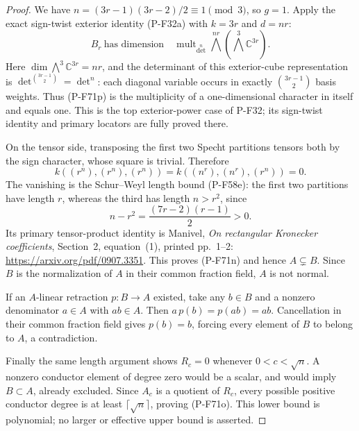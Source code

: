 \begin{proof}
We have $n=(3r-1)(3r-2)/2\equiv1\pmod3$, so $g=1$.
Apply the exact sign-twist exterior identity (P-F32a)
with $k=3r$ and $d=nr$:
\[
 B_r\ \text{has dimension}\quad
 \operatorname{mult}_{\det^n}
       \bigwedge^{nr}\!\left(\bigwedge^3\mathbb C^{3r}\right).
                                                               \tag{P-F71p}
\]
Here $\dim\bigwedge^3\mathbb C^{3r}=nr$, and the determinant
of this exterior-cube representation is
$\det^{\binom{3r-1}{2}}=\det^n$: each diagonal variable
occurs in exactly $\binom{3r-1}{2}$ basis weights.
Thus (P-F71p) is the multiplicity of a one-dimensional
character in itself and equals one.  This is the top
exterior-power case of P-F32; its sign-twist identity
and primary locators are fully proved there.

On the tensor side, transposing the first two Specht
partitions tensors both by the sign character, whose
square is trivial.  Therefore
\[
 k((r^n),(r^n),(r^n))
          =k((n^r),(n^r),(r^n))=0.
                                                               \tag{P-F71q}
\]
The vanishing is the Schur--Weyl length bound (P-F58e):
the first two partitions have length $r$, whereas the
third has length $n>r^2$, since
\[
                  n-r^2=\frac{(7r-2)(r-1)}2>0.
\]
Its primary tensor-product identity is Manivel,
\emph{On rectangular Kronecker coefficients}, Section~2,
equation~(1), printed pp.~1--2:
\url{https://arxiv.org/pdf/0907.3351}.
This proves (P-F71n) and hence $A\subsetneq B$.
Since $B$ is the normalization of $A$ in their common
fraction field, $A$ is not normal.

If an $A$-linear retraction $p:B\to A$ existed,
take any $b\in B$ and a nonzero denominator $a\in A$
with $ab\in A$.  Then
$a\,p(b)=p(ab)=ab$.  Cancellation in their common
fraction field gives $p(b)=b$, forcing every element
of $B$ to belong to $A$, a contradiction.

Finally the same length argument shows $R_c=0$
whenever $0<c<\sqrt n$.  A nonzero conductor element
of degree zero would be a scalar, and would imply
$B\subset A$, already excluded.  Since $A_c$ is a
quotient of $R_c$, every possible positive conductor
degree is at least $\lceil\sqrt n\rceil$, proving
(P-F71o).  This lower bound is polynomial; no larger
or effective upper bound is asserted.
\end{proof}

